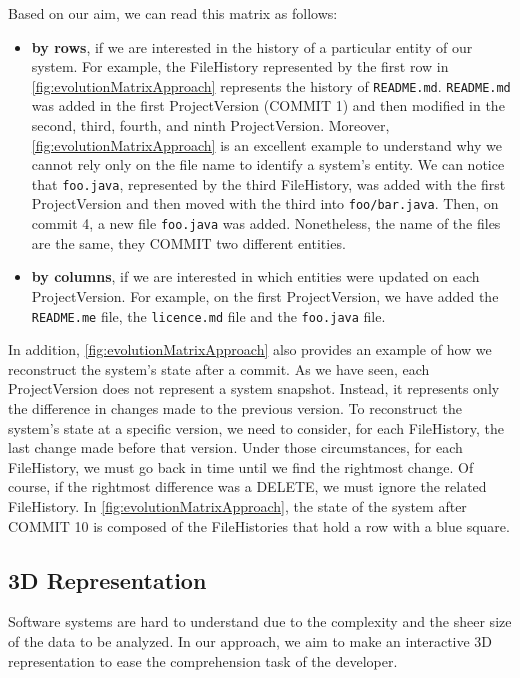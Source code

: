 Based on our aim, we can read this matrix as follows:
 \begin{itemize}
     \item \textbf{by rows}, if we are interested in the history of a particular entity of our system. 
     For example, the FileHistory represented by the first row in \autoref{fig:evolutionMatrixApproach} represents the history of \texttt{README.md}. 
     \texttt{README.md} was added in the first ProjectVersion (COMMIT 1) and then modified in the second, third, fourth, and ninth ProjectVersion.
     Moreover, \autoref{fig:evolutionMatrixApproach} is an excellent example to understand why we cannot rely only on the file name to identify a system's entity. 
     We can notice that \texttt{foo.java}, represented by the third FileHistory, was added with the first ProjectVersion and then moved with the third into \texttt{foo/bar.java}. 
     Then, on commit 4, a new file \texttt{foo.java} was added. Nonetheless, the name of the files are the same, they COMMIT two different entities. 
     \item \textbf{by columns}, if we are interested in which entities were updated on each ProjectVersion. 
    For example, on the first ProjectVersion, we have added the \texttt{README.me} file, the \texttt{licence.md} file and the \texttt{foo.java} file. 
 \end{itemize}

In addition, \autoref{fig:evolutionMatrixApproach} also provides an example of how we reconstruct the system's state after a commit. 
As we have seen, each ProjectVersion does not represent a system snapshot.
Instead, it represents only the difference in changes made to the previous version. 
To reconstruct the system's state at a specific version, we need to consider, for each FileHistory, the last change made before that version. 
Under those circumstances, for each FileHistory, we must go back in time until we find the rightmost change. Of course, if the rightmost difference was a DELETE, we must ignore the related FileHistory.
In \autoref{fig:evolutionMatrixApproach}, the state of the system after COMMIT 10 is composed of the FileHistories that hold a row with a blue square. 



\subsection{3D Representation}
\label{s:3DRepr}

Software systems are hard to understand due to the complexity and the sheer size of the data to be analyzed.
In our approach, we aim to make an interactive 3D representation to ease the comprehension task of the developer. 

